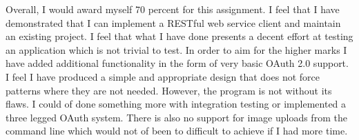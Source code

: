 \documentclass[paper=a4, fontsize=11pt]{scrartcl}	%
\numberwithin{equation}{section}															%
\numberwithin{figure}{section}																%
\numberwithin{table}{section}
\begin{document}
Overall, I would award myself 70 percent for this assignment. I feel that I have demonstrated that I can implement a RESTful web service client and maintain an existing project. I feel that what I have done presents a decent effort at testing an application which is not trivial to test. In order to aim for the higher marks I have added additional functionality in the form of very basic OAuth 2.0 support. I feel I have produced a simple and appropriate design that does not force patterns where they are not needed. However, the program is not without its flaws. I could of done something more with integration testing or implemented a three legged OAuth system. There is also no support for image uploads from the command line which would not of been to difficult to achieve if I had more time.



\end{document}
